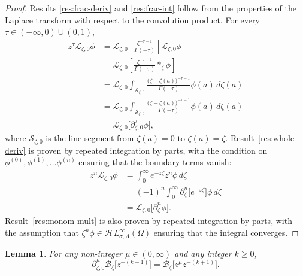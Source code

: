 \documentclass{article}
\newcommand{\singexp}[2]{\mathcal{H}L^\infty_{#1, #2}}
\newcommand{\fracderiv}[3]{\partial^{#1}_{#2, #3}}
\newcommand{\laplace}{\mathcal{L}}
\newcommand{\borel}{\mathcal{B}}
\theoremstyle{definition}
\theoremstyle{plain}
\newtheorem{lemma}[definition]{Lemma}
\begin{document}
\begin{proof}
Results \ref{res:frac-deriv} and \ref{res:frac-int} follow from the properties of the Laplace transform with respect to the convolution product. For every $\tau \in (-\infty, 0) \cup (0,1)$,
\begin{align*}
z^\tau\laplace_{\zeta,0}\phi&=\laplace_{\zeta,0}\left[\frac{\zeta^{-\tau-1}}{\Gamma(-\tau)}\right] \laplace_{\zeta,0}\phi\\
&=\laplace_{\zeta,0}\left[\frac{\zeta^{-\tau-1}}{\Gamma(-\tau)} \ast_\zeta \phi\right] \\
&=\laplace_{\zeta,0} \int_{\mathcal{S}_{\zeta,0}}\frac{\big(\zeta-\zeta(a)\big)^{-\tau-1}}{\Gamma(-\tau)} \phi(a)\,d\zeta(a)\\
&=\laplace_{\zeta,0} \int_{\mathcal{S}_{\zeta,0} }\frac{\big(\zeta-\zeta(a)\big)^{-\tau-1}}{\Gamma(-\tau)} \phi(a)\,d\zeta(a)\\
&=\laplace_{\zeta,0}\big[\fracderiv{\tau}{\zeta}{0}\phi\big],
\end{align*}
where $\mathcal{S}_{\zeta,0}$ is the line segment from $\zeta(a)=0$ to $\zeta(a) = \zeta$. Result~\ref{res:whole-deriv} is proven by repeated integration by parts, with the condition on $\phi^{(0)}, \phi^{(1)}, \ldots \phi^{(n)}$ ensuring that the boundary terms vanish:
\begin{align*}
    z^n\laplace_{\zeta,0}\phi&=\int_0^\infty e^{-z\zeta} z^n \phi \, d\zeta\\
    &=(-1)^n\int_0^\infty \partial_\zeta^n \big[e^{-z\zeta}\big]  \phi\, d\zeta\\
    &=\laplace_{\zeta,0}\big[\partial_\zeta^n \phi\big].
\end{align*}
Result~\ref{res:monom-mult} is also proven by repeated integration by parts, with the assumption that $\zeta^n\phi\in\singexp{\sigma}{\Lambda}(\Omega)$ ensuring that the integral converges.
\end{proof}
\begin{lemma}\label{lem:frac-deriv-Borel}
For any non-integer $\mu \in (0, \infty)$ and any integer $k \ge 0$,
\[ \partial^\mu_{\zeta,0} \borel_\zeta \big[z^{-(k+1)}\big] =  \borel_\zeta \big[z^\mu z^{-(k+1)}\big]. \]
\end{lemma}
\end{document}
